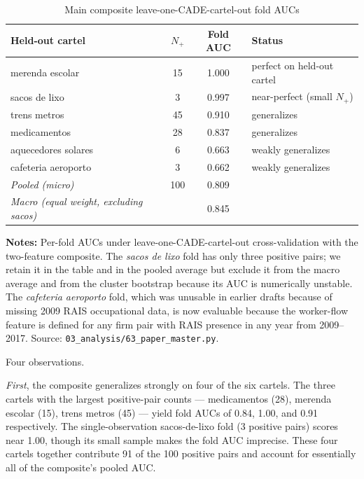 \begin{table}[htbp]
\centering
\caption{Main composite leave-one-CADE-cartel-out fold AUCs}\label{tab:fold_auc}
\small
\begin{tabular}{lccl}
\toprule
Held-out cartel & $N_+$ & Fold AUC & Status \\
\midrule
merenda escolar    & 15  & 1.000 & perfect on held-out cartel \\
sacos de lixo      &  3  & 0.997 & near-perfect (small $N_+$) \\
trens metros       & 45  & 0.910 & generalizes \\
medicamentos       & 28  & 0.837 & generalizes \\
aquecedores solares &  6  & 0.663 & weakly generalizes \\
cafeteria aeroporto &  3  & 0.662 & weakly generalizes \\
\midrule
\emph{Pooled (micro)}   & 100 & 0.809 & \\
\emph{Macro (equal weight, excluding sacos)} & & 0.845 & \\
\bottomrule
\end{tabular}
\vspace{0.5em}
\begin{minipage}{0.95\textwidth}
\scriptsize{\textbf{Notes:} Per-fold AUCs under leave-one-CADE-cartel-out cross-validation with the two-feature composite. The \emph{sacos de lixo} fold has only three positive pairs; we retain it in the table and in the pooled average but exclude it from the macro average and from the cluster bootstrap because its AUC is numerically unstable. The \emph{cafeteria aeroporto} fold, which was unusable in earlier drafts because of missing 2009 RAIS occupational data, is now evaluable because the worker-flow feature is defined for any firm pair with RAIS presence in any year from 2009--2017. Source: \texttt{03\_analysis/63\_paper\_master.py}.\par}
\end{minipage}
\end{table}

Four observations.

\emph{First}, the composite generalizes strongly on four of the six cartels. The three cartels with the largest positive-pair counts --- medicamentos (28), merenda escolar (15), trens metros (45) --- yield fold AUCs of 0.84, 1.00, and 0.91 respectively. The single-observation sacos-de-lixo fold (3 positive pairs) scores near 1.00, though its small sample makes the fold AUC imprecise. These four cartels together contribute 91 of the 100 positive pairs and account for essentially all of the composite's pooled AUC.

